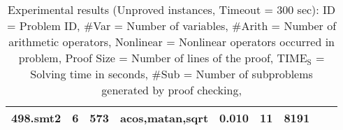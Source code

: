 \begin{table}
\begin{center}
\begin{tabular}{|l||r|r|r||r|r|r|r|r|}
498.smt2 & 6 & 573 & acos,matan,sqrt & 0.010 & 11 & 8191 \\
\hline
\end{tabular}
  \end{center}
  \caption{
    Experimental results (Unproved instances, Timeout = 300 sec):
    ID = Problem ID,
    \#Var = Number of variables,
    \#Arith = Number of arithmetic operators,
    Nonlinear = Nonlinear operators occurred in problem,
    Proof Size = Number of lines of the proof,
    $\mathrm{TIME_S}$ = Solving time in seconds,
    \#Sub = Number of subproblems generated by proof checking,
  }\label{tbl:exp}
\end{table}

